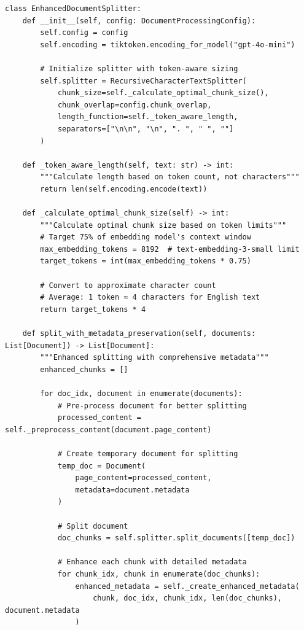 \documentclass[12pt,a4paper]{article}
\begin{document}
\begin{lstlisting}[caption=Enhanced Document Splitter with Token Awareness]
class EnhancedDocumentSplitter:
    def __init__(self, config: DocumentProcessingConfig):
        self.config = config
        self.encoding = tiktoken.encoding_for_model("gpt-4o-mini")
        
        # Initialize splitter with token-aware sizing
        self.splitter = RecursiveCharacterTextSplitter(
            chunk_size=self._calculate_optimal_chunk_size(),
            chunk_overlap=config.chunk_overlap,
            length_function=self._token_aware_length,
            separators=["\n\n", "\n", ". ", " ", ""]
        )
    
    def _token_aware_length(self, text: str) -> int:
        """Calculate length based on token count, not characters"""
        return len(self.encoding.encode(text))
    
    def _calculate_optimal_chunk_size(self) -> int:
        """Calculate optimal chunk size based on token limits"""
        # Target 75% of embedding model's context window
        max_embedding_tokens = 8192  # text-embedding-3-small limit
        target_tokens = int(max_embedding_tokens * 0.75)
        
        # Convert to approximate character count
        # Average: 1 token ≈ 4 characters for English text
        return target_tokens * 4
    
    def split_with_metadata_preservation(self, documents: List[Document]) -> List[Document]:
        """Enhanced splitting with comprehensive metadata"""
        enhanced_chunks = []
        
        for doc_idx, document in enumerate(documents):
            # Pre-process document for better splitting
            processed_content = self._preprocess_content(document.page_content)
            
            # Create temporary document for splitting
            temp_doc = Document(
                page_content=processed_content,
                metadata=document.metadata
            )
            
            # Split document
            doc_chunks = self.splitter.split_documents([temp_doc])
            
            # Enhance each chunk with detailed metadata
            for chunk_idx, chunk in enumerate(doc_chunks):
                enhanced_metadata = self._create_enhanced_metadata(
                    chunk, doc_idx, chunk_idx, len(doc_chunks), document.metadata
                )
                

\end{lstlisting}
\end{document}
